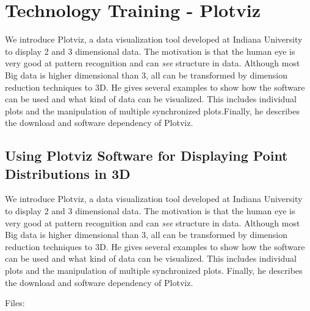 

\chapter{Technology Training - Plotviz}

\FILENAME

We introduce Plotviz, a data visualization tool developed at Indiana
University to display 2 and 3 dimensional data. The motivation is that
the human eye is very good at pattern recognition and can \textit{see}
structure in data. Although most Big data is higher dimensional than 3,
all can be transformed by dimension reduction techniques to 3D. He gives
several examples to show how the software can be used and what kind of
data can be visualized. This includes individual plots and the
manipulation of multiple synchronized plots.Finally, he describes the
download and software dependency of Plotviz.

\section{Using Plotviz Software for Displaying Point Distributions in
  3D}

We introduce Plotviz, a data visualization tool developed at Indiana
University to display 2 and 3 dimensional data. The motivation is that
the human eye is very good at pattern recognition and can \textit{see}
structure in data. Although most Big data is higher dimensional than 3,
all can be transformed by dimension reduction techniques to 3D. He gives
several examples to show how the software can be used and what kind of
data can be visualized. This includes individual plots and the
manipulation of multiple synchronized plots. Finally, he describes the
download and software dependency of Plotviz.


Files:







